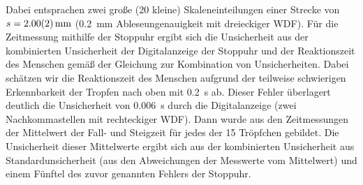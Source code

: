 \documentclass[
	a4paper,
	12pt,
	pagesize,
	ngerman
]{scrartcl}
\begin{document}
	Dabei entsprachen zwei große (20 kleine) Skaleneinteilungen  einer Strecke von $s = \SI{2\pm 0,02}{mm}$ (\SI{0,2}{mm} Ableseungenauigkeit mit dreieckiger WDF).
	Für die Zeitmessung mithilfe der Stoppuhr ergibt sich die Unsicherheit aus der kombinierten Unsicherheit der Digitalanzeige der Stoppuhr und der Reaktionszeit des Menschen gemäß der Gleichung zur Kombination von Unsicherheiten. %
	Dabei schätzen wir die Reaktionszeit des Menschen aufgrund der teilweise schwierigen Erkennbarkeit der Tropfen nach oben mit \SI{0.2}{s} ab.
	Dieser Fehler überlagert deutlich die Unsicherheit von \SI{0.006}{s} durch die Digitalanzeige (zwei Nachkommastellen mit rechteckiger WDF).
	Dann wurde aus den Zeitmessungen der Mittelwert der Fall- und Steigzeit für jedes der 15 Tröpfchen gebildet.
	Die Unsicherheit dieser Mittelwerte ergibt sich aus der kombinierten Unsicherheit aus Standardunsicherheit (aus den Abweichungen der Messwerte vom Mittelwert) und einem Fünftel des zuvor genannten Fehlers der Stoppuhr.
	
\end{document}
